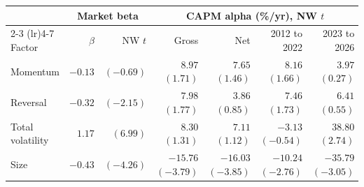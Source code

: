 \begin{tabular}{lrrrrrr}
\toprule
& \multicolumn{2}{c}{Market beta} & \multicolumn{4}{c}{CAPM alpha (\%/yr), NW $t$} \\
\cmidrule(lr){2-3} \cmidrule(lr){4-7}
Factor & $\beta$ & NW $t$ & Gross & Net & 2012 to 2022 & 2023 to 2026 \\
\midrule
Momentum & $-0.13$ & $(-0.69)$ & $8.97$ $(1.71)$ & $7.65$ $(1.46)$ & $8.16$ $(1.66)$ & $3.97$ $(0.27)$ \\
Reversal & $-0.32$ & $(-2.15)$ & $7.98$ $(1.77)$ & $3.86$ $(0.85)$ & $7.46$ $(1.73)$ & $6.41$ $(0.55)$ \\
Total volatility & $1.17$ & $(6.99)$ & $8.30$ $(1.31)$ & $7.11$ $(1.12)$ & $-3.13$ $(-0.54)$ & $38.80$ $(2.74)$ \\
Size & $-0.43$ & $(-4.26)$ & $-15.76$ $(-3.79)$ & $-16.03$ $(-3.85)$ & $-10.24$ $(-2.76)$ & $-35.79$ $(-3.05)$ \\
\bottomrule
\end{tabular}
